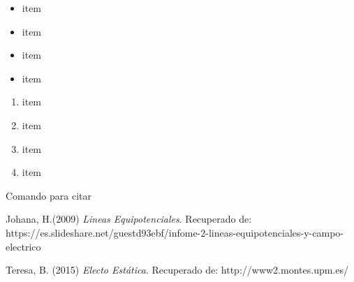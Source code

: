 \documentclass{article}
\begin{document}
\begin{multicols}{2}
\begin{itemize}
	\item item
	\item item
	\item item
	\item item
\end{itemize}

\begin{enumerate}
    \item item 
    \item item
    \item item
    \item item
\end{enumerate}


Comando para citar  \cite{Johana}

\begin{thebibliography}{9}		

   Johana, H.(2009)
   \emph{Lineas Equipotenciales}.
   Recuperado de: https://es.slideshare.net/guestd93ebf/infome-2-lineas-equipotenciales-y-campo-electrico

   Teresa, B. (2015)
   \emph{Electo Est\'atica}.
   Recuperado de: http://www2.montes.upm.es/
   
\end{thebibliography}

\end{multicols}
\end{document}
